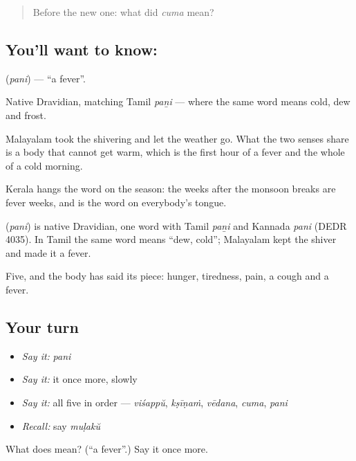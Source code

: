 \label{lesson:ML-C63-fever}



\begin{quote}
Before the new one: what did \emph{cuma} mean?
\end{quote}

\subsection*{You'll want to know: }
\textbf{} (\emph{pani}) — \textquotedblleft{}a fever\textquotedblright{}.

Native Dravidian, matching Tamil \emph{paṉi} — where the same word means cold, dew and frost.

Malayalam took the shivering and let the weather go. What the two senses share is a body that cannot get warm, which is the first hour of a fever and the whole of a cold morning.

Kerala hangs the word on the season: the weeks after the monsoon breaks are fever weeks, and  is the word on everybody's tongue.

\begin{cousinweb}
\textbf{} (\emph{pani}) is native Dravidian, one word with Tamil \emph{paṉi} and Kannada \emph{pani} (DEDR 4035). In Tamil the same word means \textquotedblleft{}dew, cold\textquotedblright{}; Malayalam kept the shiver and made it a fever.
\end{cousinweb}

\begin{grammarlens}[title={What you've built}]
Five, and the body has said its piece: hunger, tiredness, pain, a cough and a fever.
\end{grammarlens}

\subsection*{Your turn}
\begin{itemize}
\raggedright
  \item \emph{Say it:} \emph{pani}
  \item \emph{Say it:} it once more, slowly
  \item \emph{Say it:} all five in order — \emph{viśappŭ}, \emph{kṣīṇaṁ}, \emph{vēdana}, \emph{cuma}, \emph{pani}
  \item \emph{Recall:} say \emph{muḷakŭ}
\end{itemize}

\begin{tcolorbox}[breakable,colback=teal!4,colframe=teal!35!black,title={Before you move on}]
What does  mean? (\textquotedblleft{}a fever\textquotedblright{}.) Say it once more.
\end{tcolorbox}

